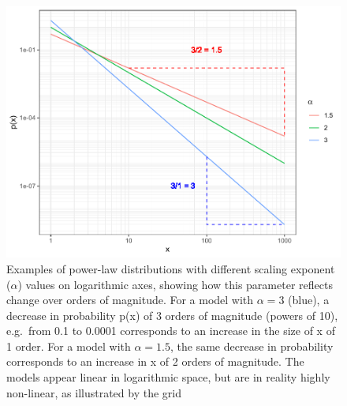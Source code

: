 \documentclass[
  12pt,
]{book}
\begin{document}
\begin{figure}

{\centering \includegraphics[width=0.9\linewidth]{bookdown-demo_files/figure-latex/04-pl-1} 

}

\caption{Examples of power-law distributions with different scaling exponent (\(\alpha\)) values on logarithmic axes, showing how this parameter reflects change over orders of magnitude. For a model with \(\alpha = 3\) (blue), a decrease in probability p(x) of 3 orders of magnitude (powers of 10), e.g.~from 0.1 to 0.0001 corresponds to an increase in the size of x of 1 order. For a model with \(\alpha = 1.5\), the same decrease in probability corresponds to an increase in x of 2 orders of magnitude. The models appear linear in logarithmic space, but are in reality highly non-linear, as illustrated by the grid}\label{fig:04-pl}
\end{figure}
\end{document}
